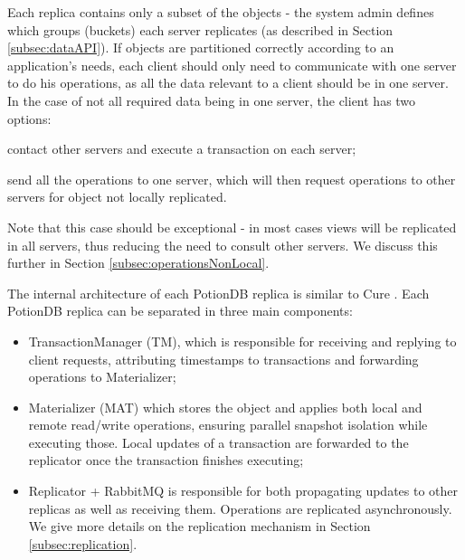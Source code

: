 \documentclass{vldb}
\newcommand{\grumbler}[2]{{\color{red}{\bf #1:} #2}}
\renewcommand{\grumbler}[2]{}
\newcommand{\andre}[1]{\grumbler{andre}{#1}}
\begin{document}
Each replica contains only a subset of the objects - the system admin defines which groups (buckets) each server replicates (as described in Section \ref{subsec:dataAPI}).
If objects are partitioned correctly according to an application's needs, each client should only need to communicate with one server to do his operations, as all the data relevant to a client should be in one server.
In the case of not all required data being in one server, the client has two options:
\begin{enumerate*}[label=(\roman*)]
	\item contact other servers and execute a transaction on each server;
	\item send all the operations to one server, which will then request operations to other servers for object not locally replicated.
\end{enumerate*}
Note that this case should be exceptional - in most cases views will be replicated in all servers, thus reducing the need to consult other servers.
We discuss this further in Section \ref{subsec:operationsNonLocal}.

\andre{Should I even mention Cure here, and if yes, what else should I say about it, mainly in terms of similarities/differences with PotionDB}

\andre{Maybe the figure reference should only be here?}

The internal architecture of each PotionDB replica is similar to Cure \cite{cure}.
Each PotionDB replica can be separated in three main components:

\begin{itemize}
	\item TransactionManager (TM), which is responsible for receiving and replying to client requests, attributing timestamps to transactions and forwarding operations to Materializer;
	\item Materializer (MAT) which stores the object and applies both local and remote read/write operations, ensuring parallel snapshot isolation while executing those.
	Local updates of a transaction are forwarded to the replicator once the transaction finishes executing;
	\item Replicator + RabbitMQ is responsible for both propagating updates to other replicas as well as receiving them. Operations are replicated asynchronously. We give more details on the replication  mechanism in Section \ref{subsec:replication}.
\end{itemize}
\end{document}
